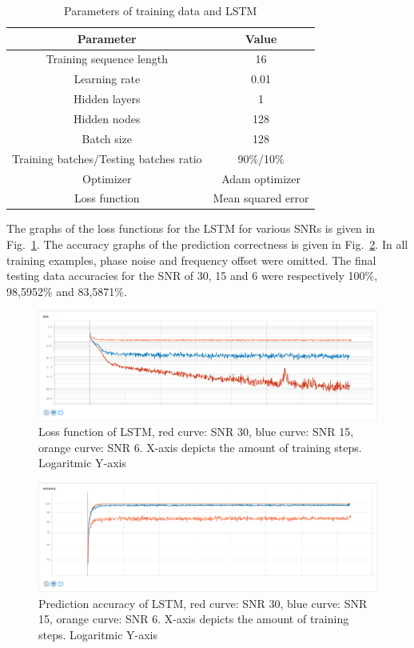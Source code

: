 \documentclass[journal,10pt,twoside, a4paper]{IEEEtran}
\begin{document}
\begin{table}
    \centering
    \caption{Parameters of training data and LSTM}
    \label{tab:lstm}
    \begin{tabular}{c|c}
        Parameter & Value\\
        \hline
        Training sequence length & 16\\
        Learning rate & 0.01\\
        Hidden layers & 1\\
        Hidden nodes & 128\\
        Batch size & 128\\
        Training batches/Testing batches ratio & 90\%/10\%\\
        Optimizer & Adam optimizer\\
        Loss function & Mean squared error\\
    \end{tabular}
\end{table}

The graphs of the loss functions for the LSTM for various SNRs is given in Fig.~\ref{fig:loss}. The accuracy graphs of the prediction correctness is given in Fig.~\ref{fig:accuracy}. In all training examples, phase noise and frequency offset were omitted. The final testing data accuracies for the SNR of 30, 15 and 6 were respectively 100\%, 98,5952\% and 83,5871\%.

\begin{figure}
    \centering
    \includegraphics[width=\linewidth]{Thesis/images/loss.png}
    \caption{Loss function of LSTM, red curve: SNR 30, blue curve: SNR 15, orange curve: SNR 6. X-axis depicts the amount of training steps. Logaritmic Y-axis}
    \label{fig:loss}
\end{figure}

\begin{figure}
    \centering
    \includegraphics[width=\linewidth]{Thesis/images/accuracy.png}
    \caption{Prediction accuracy of LSTM, red curve: SNR 30, blue curve: SNR 15, orange curve: SNR 6. X-axis depicts the amount of training steps. Logaritmic Y-axis}
    \label{fig:accuracy}
\end{figure}
\end{document}
